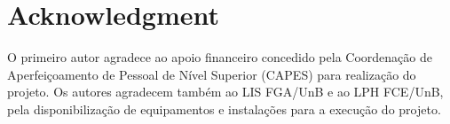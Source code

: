 \documentclass[journal]{IEEEtran}
\begin{document}



\section*{Acknowledgment}

O primeiro autor agradece ao apoio financeiro concedido pela Coordenação de Aperfeiçoamento de Pessoal de Nível Superior (CAPES) para realização do projeto.
Os autores agradecem também ao LIS FGA/UnB e ao LPH FCE/UnB, pela disponibilização de equipamentos e instalações para a execução do projeto.




\ifCLASSOPTIONcaptionsoff
  \newpage
\fi







%


% 
\end{document}

